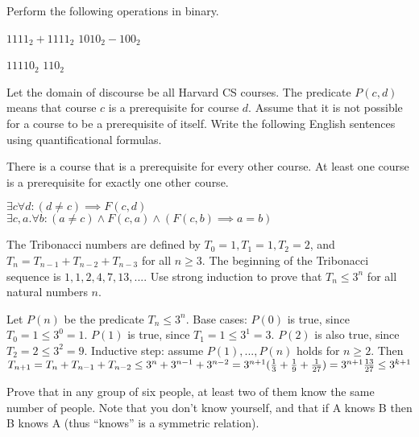 \documentclass[solution, letterpaper]{cs20exam}
\begin{document}
\problem{}{} Perform the following operations in binary.

\subproblem $1111_2 + 1111_2$
\subproblem $1010_2 - 100_2$

\begin{solution}
\subsolution $11110_2$
\subsolution $110_2$
\end{solution}

\problem{}{} Let the domain of discourse be all Harvard CS courses. The predicate $P(c, d)$ means that course $c$ is a prerequisite for course $d$. Assume that it is not possible for a course to be a prerequisite of itself. Write the following English sentences using quantificational formulas.

\subproblem There is a course that is a prerequisite for every other course.
\subproblem At least one course is a prerequisite for exactly one other course.

\begin{solution}
\subsolution $\exists c \forall d: (d \neq c) \implies F(c,d)$
\subsolution $\exists c, a . \forall b : (a \neq c) \land F(c, a) \land (F(c, b) \implies a = b)$

\end{solution}

\problem{}{} The Tribonacci numbers are defined by $T_0 = 1, T_1 = 1, T_2 = 2$, and $T_n = T_{n-1} + T_{n-2} + T_{n-3}$ for all $n \ge 3$. The beginning of the Tribonacci sequence is $1, 1, 2, 4, 7, 13, ...$. Use strong induction to prove that $T_n \le 3^n$ for all natural numbers $n$.

\begin{solution}
Let $P(n)$ be the predicate $T_n \le 3^n$. Base cases: $P(0)$ is true, since $T_0 = 1 \le 3^0 = 1$. $P(1)$ is true, since $T_1 = 1 \le 3^1 = 3$. $P(2)$ is also true, since $T_2 = 2 \le 3^2 = 9$. Inductive step: assume $P(1), ..., P(n)$ holds for $n \ge 2$. Then 
\begin{math}
T_{n+1} = T_n + T_{n-1} + T_{n-2}
\\ \le 3^n + 3^{n-1} + 3^{n-2}
\\ = 3^{n+1}(\frac{1}{3} + \frac{1}{9} + \frac{1}{27})
\\ = 3^{n+1}\frac{13}{27}
\\ \le 3^{k+1}
\end{math}
\end{solution}


\problem{}{}

Prove that in any group of six people, at least two of them know the same number of people. Note that you don't know yourself, and that if A knows B then B knows A (thus ``knows'' is a symmetric relation). 
\end{document}
